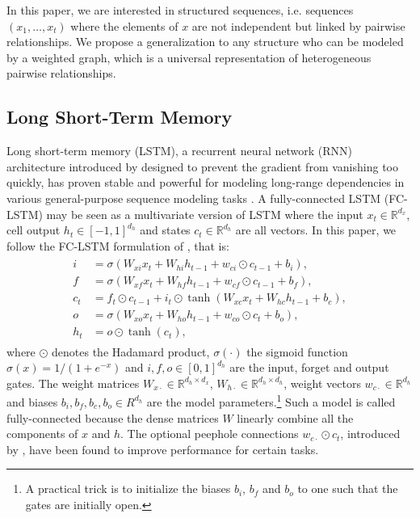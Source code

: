 \documentclass{article} %
\newcommand{\R}{\mathbb{R}}
\begin{document}
In this paper, we are interested in structured sequences, i.e. sequences $(x_1,
\ldots, x_t)$ where the elements of $x$ are not independent but linked by
pairwise relationships. We propose a generalization to any structure who can be
modeled by a weighted graph, which is a universal representation of
heterogeneous pairwise relationships.

\subsection{Long Short-Term Memory}

Long short-term memory (LSTM), a recurrent neural network (RNN) architecture
introduced by \citet{lstm} designed to prevent the gradient from vanishing too
quickly, has proven stable and powerful for modeling long-range dependencies in
various general-purpose sequence modeling tasks \citep{seq_graves,
moving_mnist, seq2seq}. A fully-connected LSTM (FC-LSTM) may be seen as a
multivariate version of LSTM where the input $x_t \in \R^{d_x}$, cell output
$h_t \in [-1,1]^{d_h}$ and states $c_t \in \R^{d_h}$ are all vectors. In this
paper, we follow the FC-LSTM formulation of \citet{convlstm}, that is:
\begin{align} \label{eqn:lstm_fc}
\begin{split}
	i &= \sigma(W_{xi} x_t + W_{hi} h_{t-1} + w_{ci} \odot c_{t-1} + b_i), \\
	f &= \sigma(W_{xf} x_t + W_{hf} h_{t-1} + w_{cf} \odot c_{t-1} + b_f), \\
	c_t &= f_t \odot c_{t-1} + i_t \odot \tanh(W_{xc} x_t + W_{hc} h_{t-1} + b_c), \\
	o &= \sigma(W_{xo} x_t + W_{ho} h_{t-1} + w_{co} \odot c_t + b_o), \\
	h_t &= o \odot \tanh(c_t),
\end{split}
\end{align}
where $\odot$ denotes the Hadamard product, $\sigma(\cdot)$ the sigmoid
function $\sigma(x) = 1 / (1+e^{-x})$ and $i, f, o \in [0,1]^{d_h}$ are the
input, forget and output gates. The weight matrices $W_{x\cdot} \in \R^{d_h
\times d_x}$, $W_{h\cdot} \in \R^{d_h \times d_h}$, weight vectors $w_{c\cdot}
\in \R^{d_h}$ and biases $b_i, b_f, b_c, b_o \in R^{d_h}$ are the model
parameters.\footnote{A practical trick is to initialize the biases $b_i$, $b_f$
and $b_o$ to one such that the gates are initially open.} 
Such a model is called fully-connected because the dense matrices $W$ linearly combine all the components of $x$ and $h$.
The optional peephole connections $w_{c\cdot} \odot c_t$, introduced by \citet{peephole}, have been found to improve performance for certain tasks.
\end{document}
